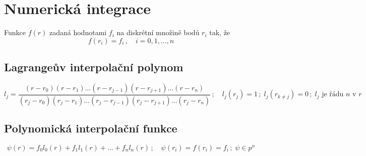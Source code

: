 \documentclass[10pt,oneside]{article}
\begin{document}
\newpage
\section*{Numerická integrace}


Funkce $f(r)$ zadaná hodnotami $f_i$ na diskrétní množině bodů $r_i$ tak, že
%
\begin{equation}
	f(r_i) = f_i \,,\quad i = 0,1,\dots,n
\end{equation}

\subsection*{Lagrangeův interpolační polynom}
\begin{equation}
l_j = \frac{(r-r_0)(r-r_1)\dots(r-r_{j-1})(r-r_{j+1})\dots(r-r_n)}{(r_j-r_0)(r_j-r_1)\dots(r_j-r_{j-1})(r_j-r_{j+1})\dots(r_j-r_n)}
\,;\quad
l_j(r_j) = 1 \,;\;
l_j(r_{k \neq j}) = 0 \,;\;
l_j \text{ je řádu $n$ v $r$}
\end{equation}

\subsection*{Polynomická interpolační funkce}
\begin{equation}
\psi(r) = f_0 l_0(r) + f_1 l_1(r) + \dots + f_n l_n(r)
\,;\quad
\psi(r_i) = f(r_i) = f_i \,;\;
\psi \in p^n
\end{equation}
\end{document}
